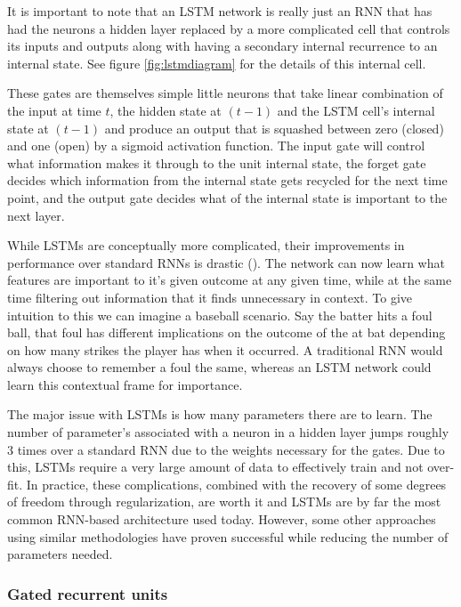 \documentclass[]{book}
\theoremstyle{definition}
\theoremstyle{definition}
\theoremstyle{definition}
\theoremstyle{remark}
\begin{document}
It is important to note that an LSTM network is really just an RNN that
has had the neurons a hidden layer replaced by a more complicated cell
that controls its inputs and outputs along with having a secondary
internal recurrence to an internal state. See figure
\ref{fig:lstmdiagram} for the details of this internal cell.

These gates are themselves simple little neurons that take linear
combination of the input at time \(t\), the hidden state at \((t - 1)\)
and the LSTM cell's internal state at \((t - 1)\) and produce an output
that is squashed between zero (closed) and one (open) by a sigmoid
activation function. The input gate will control what information makes
it through to the unit internal state, the forget gate decides which
information from the internal state gets recycled for the next time
point, and the output gate decides what of the internal state is
important to the next layer.

While LSTMs are conceptually more complicated, their improvements in
performance over standard RNNs is drastic (\citet{lstm_intro}). The
network can now learn what features are important to it's given outcome
at any given time, while at the same time filtering out information that
it finds unnecessary in context. To give intuition to this we can
imagine a baseball scenario. Say the batter hits a foul ball, that foul
has different implications on the outcome of the at bat depending on how
many strikes the player has when it occurred. A traditional RNN would
always choose to remember a foul the same, whereas an LSTM network could
learn this contextual frame for importance.

The major issue with LSTMs is how many parameters there are to learn.
The number of parameter's associated with a neuron in a hidden layer
jumps roughly 3 times over a standard RNN due to the weights necessary
for the gates. Due to this, LSTMs require a very large amount of data to
effectively train and not over-fit. In practice, these complications,
combined with the recovery of some degrees of freedom through
regularization, are worth it and LSTMs are by far the most common
RNN-based architecture used today. However, some other approaches using
similar methodologies have proven successful while reducing the number
of parameters needed.

\subsubsection{Gated recurrent units}\label{gated-recurrent-units}
\end{document}
